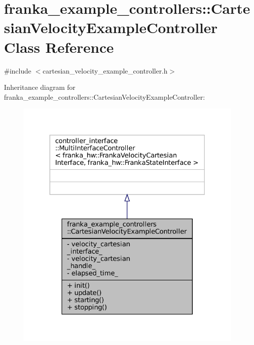 \hypertarget{classfranka__example__controllers_1_1CartesianVelocityExampleController}{}\section{franka\+\_\+example\+\_\+controllers\+:\+:Cartesian\+Velocity\+Example\+Controller Class Reference}
\label{classfranka__example__controllers_1_1CartesianVelocityExampleController}


{\ttfamily \#include $<$cartesian\+\_\+velocity\+\_\+example\+\_\+controller.\+h$>$}



Inheritance diagram for franka\+\_\+example\+\_\+controllers\+:\+:Cartesian\+Velocity\+Example\+Controller\+:
\nopagebreak
\begin{figure}[H]
\begin{center}
\leavevmode
\includegraphics[width=315pt]{classfranka__example__controllers_1_1CartesianVelocityExampleController__inherit__graph}
\end{center}
\end{figure}


